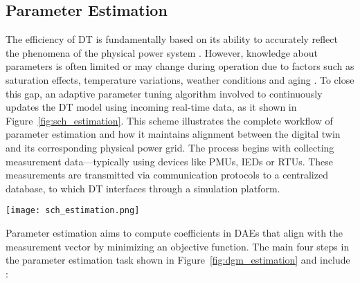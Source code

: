 \subsection{Parameter Estimation}\label{subsec:ch2/sec2/sub2}

The efficiency of DT is fundamentally based on its ability to accurately reflect the phenomena of the physical power system \autocite{Song2019}. However, knowledge about parameters is often limited or may change during operation due to factors such as saturation effects, temperature variations, weather conditions and aging \autocite{10615087}. To close this gap, an adaptive parameter tuning algorithm involved to continuously updates the DT model using incoming real-time data, as it shown in Figure~\cref{fig:sch_estimation}. This scheme illustrates the complete workflow of parameter estimation and how it maintains alignment between the digital twin and its corresponding physical power grid. The process begins with collecting measurement data—typically using devices like PMUs, IEDs or RTUs. These measurements are transmitted via communication protocols to a centralized database, to which DT interfaces through a simulation platform.

\begin{figure*}[htbp]
    \centering
    \texttt{[image: sch\_estimation.png]}
    \caption{Digital twin parameter identification schematic}
    \label{fig:sch_estimation}
\end{figure*}

Parameter estimation aims to compute coefficients in DAEs that align with the measurement vector by minimizing an objective function. The main four steps in the parameter estimation task shown in Figure~\cref{fig:dgm_estimation} and include \autocite{Vu2015}: 


